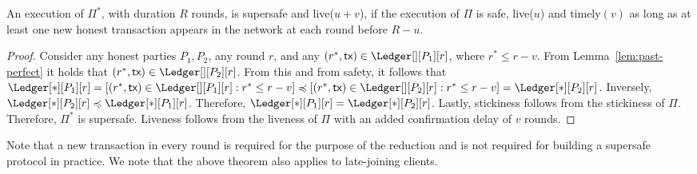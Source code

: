 
\begin{theorem} \label{thm:timeliness-to-supersafety}
  An execution of $\Pi^*$, with duration $R$ rounds, is supersafe
  and live($u + v$), if the execution of
  $\Pi$ is safe, live($u$) and timely$(v)$
  as long as at least one new honest transaction appears in the
  network at each round before $R - u$.
\end{theorem}
\begin{proof}
  Consider any honest parties $P_1,P_2$, any round $r$, and any
  $(r^*, \tx) \in \Ledger[][P_1][r]$, where $r^* \leq r - v$.
  From Lemma~\ref{lem:past-perfect} it holds that
  $(r^*, \tx) \in \Ledger[][P_2][r]$.
  From this and from safety, it follows that
  $\Ledger[*][P_1][r] = [(r^*, \tx) \in \Ledger[][P_1][r]: r^* \leq r - v] \preccurlyeq
  [(r^*, \tx) \in \Ledger[][P_2][r]: r^* \leq r - v] = \Ledger[*][P_2][r]$.
  Inversely, $\Ledger[*][P_2][r] \preccurlyeq \Ledger[*][P_1][r]$.
  Therefore, $\Ledger[*][P_1][r] = \Ledger[*][P_2][r]$.
  Lastly, stickiness follows from the stickiness of $\Pi$.
  Therefore, $\Pi^*$ is supersafe.
  Liveness follows from the liveness of $\Pi$ with an added
  confirmation delay of $v$ rounds.
  \Qed
\end{proof}

Note that a new transaction in every round is required for the purpose of the reduction and is not required for building a supersafe protocol in practice.
We note that the above theorem also applies to late-joining clients.

